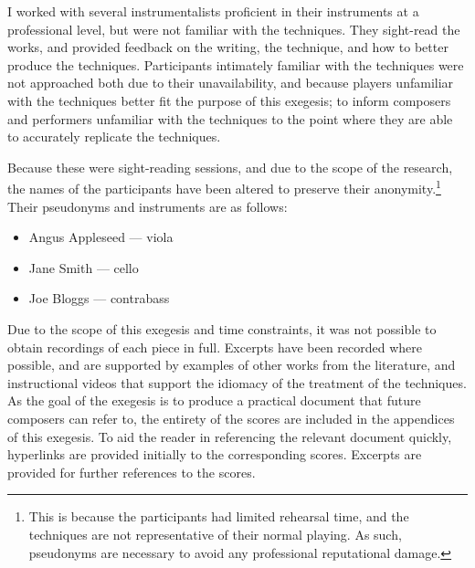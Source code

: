 I worked with several instrumentalists proficient in their instruments at a professional level, but were not familiar with the techniques.
They sight-read the works, and provided feedback on the writing, the technique, and how to better produce the techniques.
Participants intimately familiar with the techniques were not approached both due to their unavailability, and because players unfamiliar with the techniques better fit the purpose of this exegesis; 
to inform composers and performers unfamiliar with the techniques to the point where they are able to accurately replicate the techniques.

Because these were sight-reading sessions, and due to the scope of the research, the names of the participants have been altered to preserve their anonymity.\footnote{This is because the participants had limited rehearsal time, and the techniques are not representative of their normal playing. As such, pseudonyms are necessary to avoid any professional reputational damage.}
Their pseudonyms and instruments are as follows:

\begin{itemize}
  \item Angus Appleseed --- viola
  \item Jane Smith --- cello
  \item Joe Bloggs --- contrabass
\end{itemize}

Due to the scope of this exegesis and time constraints, it was not possible to obtain recordings of each piece in full.
Excerpts have been recorded where possible, and are supported by examples of other works from the literature, and instructional videos that support the idiomacy of the treatment of the techniques.
As the goal of the exegesis is to produce a practical document that future composers can refer to, the entirety of the scores are included in the appendices of this exegesis.
To aid the reader in referencing the relevant document quickly, hyperlinks are provided initially to the corresponding scores. 
Excerpts are provided for further references to the scores.

